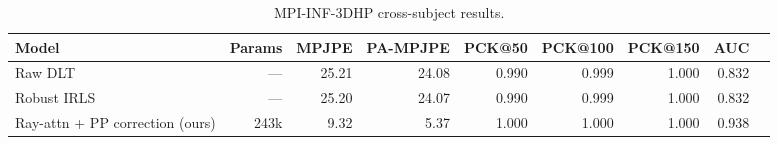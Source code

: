 \begin{table}[t]
  \centering
  \caption{MPI-INF-3DHP cross-subject results.}
  \label{tab:main_results}
  \begin{tabular}{lrrrrrrrr}
    \toprule
    Model & Params & MPJPE & PA-MPJPE & PCK@50 & PCK@100 & PCK@150 & AUC \\
    \midrule
    Raw DLT & — & 25.21 & 24.08 & 0.990 & 0.999 & 1.000 & 0.832 \\
    Robust IRLS & — & 25.20 & 24.07 & 0.990 & 0.999 & 1.000 & 0.832 \\
    Ray-attn + PP correction (ours) & 243k & 9.32 & 5.37 & 1.000 & 1.000 & 1.000 & 0.938 \\
    \bottomrule
  \end{tabular}
\end{table}